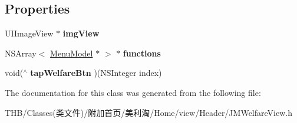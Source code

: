 \subsection*{Properties}
\begin{DoxyCompactItemize}
\item 
\mbox{\label{interface_j_m_welfare_view_a8ee95b5c181fda6758176639e82cc273}} 
U\+I\+Image\+View $\ast$ {\bfseries img\+View}
\item 
\mbox{\label{interface_j_m_welfare_view_ad63ce63895ec4d5b5e354dcaabaee4d9}} 
N\+S\+Array$<$ \mbox{\hyperlink{interface_menu_model}{Menu\+Model}} $\ast$ $>$ $\ast$ {\bfseries functions}
\item 
\mbox{\label{interface_j_m_welfare_view_a4e6dbe633654fdaf8c7b831897dcadbb}} 
void($^\wedge$ {\bfseries tap\+Welfare\+Btn} )(N\+S\+Integer index)
\end{DoxyCompactItemize}


The documentation for this class was generated from the following file\+:\begin{DoxyCompactItemize}
\item 
T\+H\+B/\+Classes(类文件)/附加首页/美利淘/\+Home/view/\+Header/J\+M\+Welfare\+View.\+h\end{DoxyCompactItemize}
